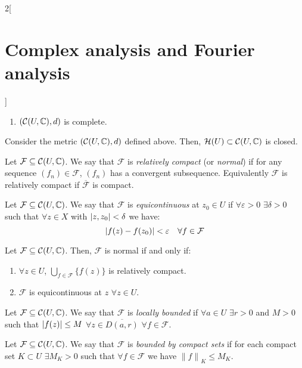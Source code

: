 \documentclass[../../../main.tex]{subfiles}
\begin{document}
\begin{multicols}{2}[\section{Complex analysis and Fourier analysis}]
\begin{theorem}
\begin{enumerate}
      \item $(\mathcal{C}(U,\mathbb{C}),d)$ is complete.
    \end{enumerate}
  \end{theorem}
  \begin{proposition}
    Consider the metric $(\mathcal{C}(U,\mathbb{C}),d)$ defined above. Then, $\mathcal{H}(U)\subset\mathcal{C}(U,\mathbb{C})$ is closed.
  \end{proposition}
  \begin{definition}
    Let $\mathcal{F}\subseteq \mathcal{C}(U,\mathbb{C})$. We say that $\mathcal{F}$ is \emph{relatively compact} (or \emph{normal}) if for any sequence $(f_n)\in\mathcal{F}$, $(f_n)$ has a convergent subsequence. Equivalently $\mathcal{F}$ is relatively compact if $\overline{\mathcal{F}}$ is compact.
  \end{definition}
  \begin{definition}
    Let $\mathcal{F}\subseteq \mathcal{C}(U,\mathbb{C})$. We say that $\mathcal{F}$ is \emph{equicontinuous} at $z_0\in U$ if $\forall \varepsilon>0$ $\exists \delta>0$ such that $\forall z\in X$ with $\abs{z,z_0}<\delta$ we have: $$\abs{f(z)-f(z_0)}<\varepsilon\quad\forall f\in \mathcal{F}$$
  \end{definition}
  \begin{theorem}
    Let $\mathcal{F}\subseteq \mathcal{C}(U,\mathbb{C})$. Then, $\mathcal{F}$ is normal if and only if:
    \begin{enumerate}
      \item $\forall z\in U$, $\bigcup_{f\in\mathcal{F}}\{f(z)\}$ is relatively compact.
      \item $\mathcal{F}$ is equicontinuous at $z$ $\forall z\in U$.
    \end{enumerate}
  \end{theorem}
  \begin{definition}
    Let $\mathcal{F}\subseteq \mathcal{C}(U,\mathbb{C})$. We say that $\mathcal{F}$ is \emph{locally bounded} if $\forall a\in U$ $\exists r>0$ and $M>0$ such that $\abs{f(z)}\leq M$ $\forall z\in \overline{D(a,r)}$ $\forall f\in\mathcal{F}$.
  \end{definition}
  \begin{definition}
    Let $\mathcal{F}\subseteq \mathcal{C}(U,\mathbb{C})$. We say that $\mathcal{F}$ is \emph{bounded by compact sets} if for each compact set $K\subset U$ $\exists M_K>0$ such that $\forall f\in\mathcal{F}$ we have ${\|f\|}_{K}\leq M_K$.
  \end{definition}
  \begin{lemma}

\end{lemma}
\end{multicols}
\end{document}
